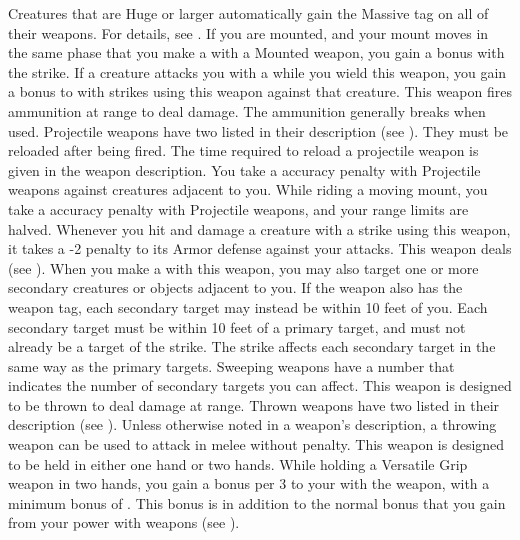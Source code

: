     Creatures that are Huge or larger automatically gain the Massive tag on all of their weapons.
    For details, see .
    \label{Mounted Weapon} If you are mounted, and your mount moves in the same phase that you make a  with a Mounted weapon, you gain a   bonus with the strike.
     If a creature attacks you with a   while you wield this weapon, you  gain a  bonus to  with strikes using this weapon against that creature.
     This weapon fires ammunition at range to deal damage.
    The ammunition generally breaks when used.
    Projectile weapons have two  listed in their description (see ).
    They must be reloaded after being fired.
    The time required to reload a projectile weapon is given in the weapon description.
    You take a  accuracy penalty with Projectile weapons against creatures adjacent to you.
    While riding a moving mount, you take a  accuracy penalty with Projectile weapons, and your range limits are halved.
     Whenever you hit and damage a creature with a strike using this weapon, it  takes a -2 penalty to its Armor defense against your attacks.
     This weapon deals  (see ).
    \label{Sweeping} When you make a   with this weapon, you may also target one or more secondary creatures or objects adjacent to you.
    If the weapon also has the  weapon tag, each secondary target may instead be within 10 feet of you.
    Each secondary target must be within 10 feet of a primary target, and must not already be a target of the strike.
    The strike affects each secondary target in the same way as the primary targets.
    Sweeping weapons have a number that indicates the number of secondary targets you can affect.
     This weapon is designed to be thrown to deal damage at range.
    Thrown weapons have two  listed in their description (see ).
    Unless otherwise noted in a weapon's description, a throwing weapon can be used to attack in melee without penalty.
     This weapon is designed to be held in either one hand or two hands.
    While holding a Versatile Grip weapon in two hands, you gain a  bonus per 3  to your  with the weapon, with a minimum bonus of .
    This bonus is in addition to the normal bonus that you gain from your power with weapons (see ).

